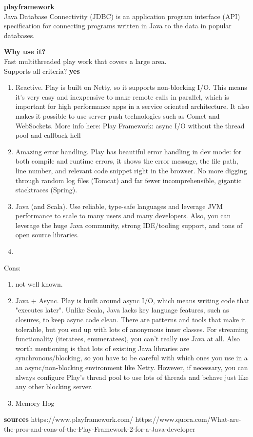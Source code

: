 
\textbf{playframework} \\
Java Database Connectivity (JDBC) is an application program interface (API) specification for connecting programs written in Java to the data in popular databases.

\textbf{Why use it?} \\
Fast multithreaded play work that covers a large area.\\

Supports all criteria?
\textbf{yes}

\begin{enumerate}
	\item Reactive. Play is built on Netty, so it supports non-blocking I/O. This means it's very easy and inexpensive to make remote calls in parallel, which is important for high performance apps in a service oriented architecture. It also makes it possible to use server push technologies such as Comet and WebSockets. More info here: Play Framework: async I/O without the thread pool and callback hell 
	\item Amazing error handling. Play has beautiful error handling in dev mode: for both compile and runtime errors, it shows the error message, the file path, line number, and relevant code snippet right in the browser. No more digging through random log files (Tomcat) and far fewer incomprehensible, gigantic stacktraces (Spring).
	\item Java (and Scala). Use reliable, type-safe languages and leverage JVM performance to scale to many users and many developers. Also, you can leverage the huge Java community, strong IDE/tooling support, and tons of open source libraries.
	\item 
\end{enumerate}
Cons:
\begin{enumerate}
	\item not well known.
	\item Java + Async. Play is built around async I/O, which means writing code that "executes later". Unlike Scala, Java lacks key language features, such as closures, to keep async code clean. There are patterns and tools that make it tolerable, but you end up with lots of anonymous inner classes. For streaming functionality (iteratees, enumeratees), you can't really use Java at all. Also worth mentioning is that lots of existing Java libraries are synchronous/blocking, so you have to be careful with which ones you use in a an async/non-blocking environment like Netty. However, if necessary, you can always configure Play's thread pool to use lots of threads and behave just like any other blocking server.
	\item Memory Hog
\end{enumerate}

\textbf{sources}
https://www.playframework.com/
https://www.quora.com/What-are-the-pros-and-cons-of-the-Play-Framework-2-for-a-Java-developer